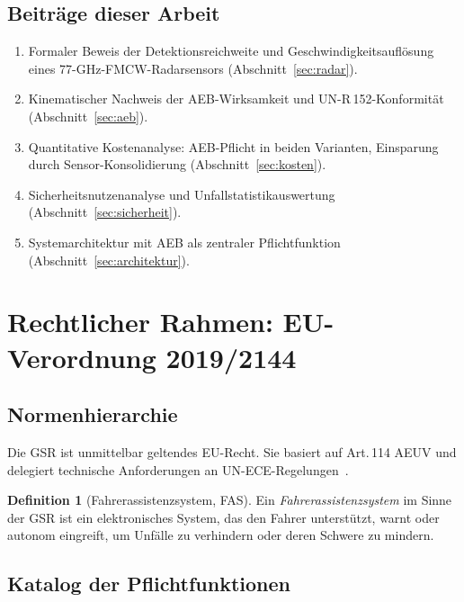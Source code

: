 \documentclass[a4paper,12pt]{article}
\theoremstyle{definition}
\newtheorem{definition}{Definition}
\begin{document}
\subsection{Beitr\"age dieser Arbeit}

\begin{enumerate}
  \item Formaler Beweis der Detektionsreichweite und Geschwindigkeitsaufl\"osung
        eines 77-GHz-FMCW-Radarsensors (Abschnitt~\ref{sec:radar}).
  \item Kinematischer Nachweis der AEB-Wirksamkeit und UN-R\,152-Konformit\"at
        (Abschnitt~\ref{sec:aeb}).
  \item Quantitative Kostenanalyse: AEB-Pflicht in beiden Varianten, Einsparung
        durch Sensor-Konsolidierung (Abschnitt~\ref{sec:kosten}).
  \item Sicherheitsnutzenanalyse und Unfallstatistikauswertung
        (Abschnitt~\ref{sec:sicherheit}).
  \item Systemarchitektur mit AEB als zentraler Pflichtfunktion
        (Abschnitt~\ref{sec:architektur}).
\end{enumerate}

\section{Rechtlicher Rahmen: EU-Verordnung 2019/2144}
\label{sec:rechtlich}

\subsection{Normenhierarchie}

Die GSR ist unmittelbar geltendes EU-Recht. Sie basiert auf Art.\,114 AEUV
und delegiert technische Anforderungen an UN-ECE-Regelungen~\cite{unece2021}.

\begin{definition}[Fahrerassistenzsystem, FAS]
Ein \emph{Fahrerassistenzsystem} im Sinne der GSR ist ein elektronisches
System, das den Fahrer unterst\"utzt, warnt oder autonom eingreift, um
Unf\"alle zu verhindern oder deren Schwere zu mindern.
\end{definition}

\subsection{Katalog der Pflichtfunktionen}
\end{document}
